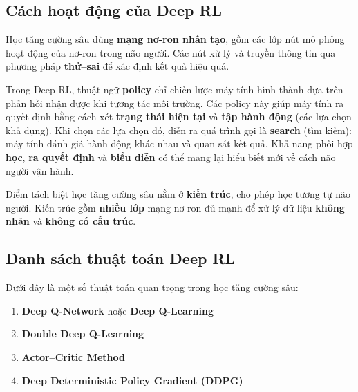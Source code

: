\subsection{Cách hoạt động của Deep RL}

\begin{phuongphap}[title={Mạng nơ-ron và học thử--sai}]
Học tăng cường sâu dùng \textbf{mạng nơ-ron nhân tạo}, gồm các lớp nút mô phỏng hoạt động của nơ-ron trong não người.
Các nút xử lý và truyền thông tin qua phương pháp \textbf{thử--sai} để xác định kết quả hiệu quả.
\end{phuongphap}

\begin{ynghia}[title={Chính sách, tìm kiếm và đại diện}]
Trong Deep RL, thuật ngữ \textbf{policy} chỉ chiến lược máy tính hình thành dựa trên phản hồi nhận được khi tương tác môi trường.
Các policy này giúp máy tính ra quyết định bằng cách xét \textbf{trạng thái hiện tại} và \textbf{tập hành động} (các lựa chọn khả dụng).
Khi chọn các lựa chọn đó, diễn ra quá trình gọi là \textbf{search} (tìm kiếm): máy tính đánh giá hành động khác nhau và quan sát kết quả.
Khả năng phối hợp \textbf{học}, \textbf{ra quyết định} và \textbf{biểu diễn} có thể mang lại hiểu biết mới về cách não người vận hành.
\end{ynghia}

\begin{tinhchat}[title={Kiến trúc đặc trưng của Deep RL}]
Điểm tách biệt học tăng cường sâu nằm ở \textbf{kiến trúc}, cho phép học tương tự não người.
Kiến trúc gồm \textbf{nhiều lớp} mạng nơ-ron đủ mạnh để xử lý dữ liệu \textbf{không nhãn} và \textbf{không có cấu trúc}.
\end{tinhchat}

\subsection{Danh sách thuật toán Deep RL}

\begin{phuongphap}[title={Các thuật toán quan trọng}]
Dưới đây là một số thuật toán quan trọng trong học tăng cường sâu:
\begin{enumerate}
  \item \textbf{Deep Q-Network} hoặc \textbf{Deep Q-Learning}
  \item \textbf{Double Deep Q-Learning}
  \item \textbf{Actor--Critic Method}
  \item \textbf{Deep Deterministic Policy Gradient (DDPG)}
\end{enumerate}
\end{phuongphap}

